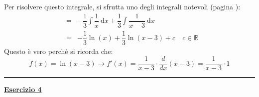 \documentclass[a4paper]{article}
\newcommand{\longline}{\noindent\rule{\textwidth}{0.4pt}}
\newcommand{\example}[1]{\textcolor{Green4}{\textbf{#1}}}
\begin{document}
	\noindent
	Per risolvere questo integrale, si sfrutta uno degli integrali notevoli (pagina \pageref{subsubsection: integrali fondamentali (o notevoli)}):
	\begin{equation*}
		\begin{array}{rcl}
			&=& \displaystyle -\dfrac{1}{3}\int \dfrac{1}{x} \: \mathrm{d}x + \displaystyle\dfrac{1}{3}\int \dfrac{1}{x-3} \: \mathrm{d}x \\ [2em]
			&=& -\dfrac{1}{3}\ln\left(x\right) + \dfrac{1}{3}\ln\left(x-3\right) + c \hspace{1em} c \in \mathbb{R}
		\end{array}
	\end{equation*}
	Questo è vero perché si ricorda che:
	\begin{equation*}
		f\left(x\right) = \ln\left(x-3\right) \longrightarrow f'\left(x\right) = \dfrac{1}{x-3} \cdot \dfrac{d}{dx}\left(x-3\right) = \dfrac{1}{x-3} \cdot 1
	\end{equation*}

	\longline

	\begin{flushleft}
		\example{\underline{Esercizio 4}}
	\end{flushleft}
	
\end{document}
